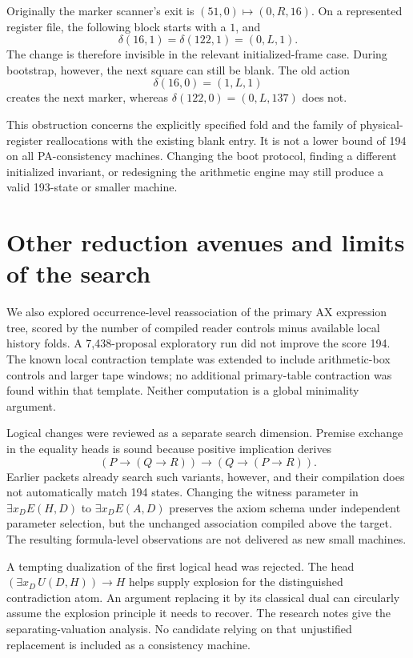 \documentclass[11pt]{article}
\begin{document}
Originally the marker scanner's exit is
$(51,0)\mapsto(0,R,16)$. On a represented register file, the following block
starts with a $1$, and
\[
 \delta(16,1)=\delta(122,1)=(0,L,1).
\]
The change is therefore invisible in the relevant initialized-frame case.
During bootstrap, however, the next square can still be blank. The old action
\[
 \delta(16,0)=(1,L,1)
\]
creates the next marker, whereas $\delta(122,0)=(0,L,137)$ does not.



This obstruction concerns the explicitly specified fold and the family of
physical-register reallocations with the existing blank entry. It is not a
lower bound of 194 on all PA-consistency machines. Changing the boot protocol,
finding a different initialized invariant, or redesigning the arithmetic
engine may still produce a valid 193-state or smaller machine.

\section{Other reduction avenues and limits of the search}

We also explored occurrence-level reassociation of the primary AX expression
tree, scored by the number of compiled reader controls minus available local
history folds. A 7,438-proposal exploratory run did not improve the score 194.
The known local contraction template was extended to include arithmetic-box
controls and larger tape windows; no additional primary-table contraction
was found within that template. Neither computation is a global minimality
argument.

Logical changes were reviewed as a separate search dimension. Premise
exchange in the equality heads is sound because positive implication derives
\[
 (P\to(Q\to R))\to(Q\to(P\to R)).
\]
Earlier packets already search such variants, however, and their compilation
does not automatically match 194 states. Changing the witness parameter in
$\exists x_D E(H,D)$ to $\exists x_D E(A,D)$ preserves the axiom schema under
independent parameter selection, but the unchanged association compiled above
the target. The resulting formula-level observations are not delivered as new
small machines.

A tempting dualization of the first logical head was rejected. The head
$(\exists x_D\,U(D,H))\to H$ helps supply explosion for the distinguished
contradiction atom. An argument replacing it by its classical dual can
circularly assume the explosion principle it needs to recover. The research
notes give the separating-valuation analysis. No candidate relying on that
unjustified replacement is included as a consistency machine.
\end{document}
